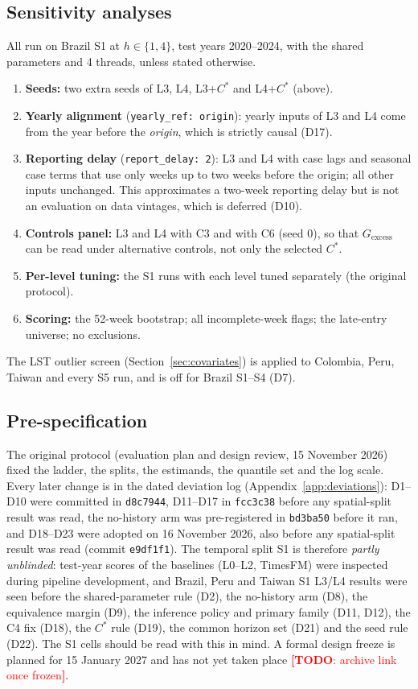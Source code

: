 \documentclass[11pt]{article}
\DeclareRobustCommand{\todo}[1]{\textcolor{red}{\textbf{[TODO}\if\relax\detokenize{#1}\relax\else: #1\fi\textbf{]}}}
\newcommand{\Gex}{G_{\mathrm{excess}}}
\newcommand{\Cstar}{C^{\ast}}
\begin{document}
\subsection{Sensitivity analyses}
\label{sec:sensitivity}
All run on Brazil S1 at $h\in\{1,4\}$, test years 2020--2024, with the shared parameters and 4 threads,
unless stated otherwise.
\begin{enumerate}
  \item \textbf{Seeds:} two extra seeds of L3, L4, L3+$\Cstar$ and L4+$\Cstar$ (above).
  \item \textbf{Yearly alignment} (\texttt{yearly\_ref: origin}): yearly inputs of L3 and L4 come from the
  year before the \emph{origin}, which is strictly causal (D17).
  \item \textbf{Reporting delay} (\texttt{report\_delay: 2}): L3 and L4 with case lags and seasonal case
  terms that use only weeks up to two weeks before the origin; all other inputs unchanged. This
  approximates a two-week reporting delay but is not an evaluation on data vintages, which is deferred
  (D10).
  \item \textbf{Controls panel:} L3 and L4 with C3 and with C6 (seed 0), so that $\Gex$ can be read under
  alternative controls, not only the selected $\Cstar$.
  \item \textbf{Per-level tuning:} the S1 runs with each level tuned separately (the original protocol).
  \item \textbf{Scoring:} the 52-week bootstrap; all incomplete-week flags; the late-entry universe; no
  exclusions.
\end{enumerate}
The LST outlier screen (Section~\ref{sec:covariates}) is applied to Colombia, Peru, Taiwan and every S5
run, and is off for Brazil S1--S4 (D7).

\subsection{Pre-specification}
\label{sec:prespec}
The original protocol (evaluation plan and design review, 15 November 2026) fixed the ladder, the
splits, the estimands, the quantile set and the log scale. Every later change is in the dated deviation
log (Appendix~\ref{app:deviations}): D1--D10 were committed in \texttt{d8c7944}, D11--D17 in
\texttt{fcc3c38} before any spatial-split result was read, the no-history arm was pre-registered in
\texttt{bd3ba50} before it ran, and D18--D23 were adopted on 16 November 2026, also before any
spatial-split result was read (commit \texttt{e9df1f1}). The temporal split S1 is therefore
\emph{partly unblinded}: test-year scores of the baselines (L0--L2, TimesFM) were inspected during
pipeline development, and Brazil, Peru and Taiwan S1 L3/L4 results were seen before the shared-parameter
rule (D2), the no-history arm (D8), the equivalence margin (D9), the inference policy and primary family
(D11, D12), the C4 fix (D18), the $\Cstar$ rule (D19), the common horizon set (D21) and the seed rule
(D22). The S1 cells should be read with this in mind. A formal design freeze is planned for
15 January 2027 and has not yet taken place \todo{archive link once frozen}.
\end{document}
